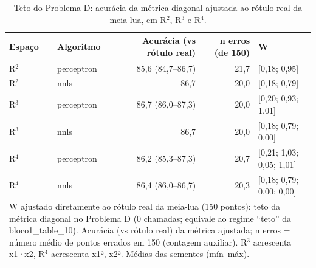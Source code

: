 \begin{table}[htbp]
\centering
\small
\caption{Teto do Problema D: acurácia da métrica diagonal ajustada ao rótulo real da meia-lua, em R$^2$, R$^3$ e R$^4$.}
\label{tab:bloco1_D_teto_oraculo_meialua}
\begin{tabular}{llrrl}
\toprule
Espaço & Algoritmo & Acurácia (vs rótulo real) & n erros (de 150) & W \\
\midrule
R$^2$ & perceptron & 85,6 (84,7–86,7) & 21,7 & [0,18; 0,95] \\
R$^2$ & nnls & 86,7 & 20,0 & [0,18; 0,79] \\
R$^3$ & perceptron & 86,7 (86,0–87,3) & 20,0 & [0,20; 0,93; 1,01] \\
R$^3$ & nnls & 86,7 & 20,0 & [0,18; 0,79; 0,00] \\
R$^4$ & perceptron & 86,2 (85,3–87,3) & 20,7 & [0,21; 1,03; 0,05; 1,01] \\
R$^4$ & nnls & 86,4 (86,0–86,7) & 20,3 & [0,18; 0,79; 0,00; 0,00] \\
\bottomrule
\multicolumn{5}{p{0.95\linewidth}}{\footnotesize W ajustado diretamente ao rótulo real da meia-lua (150 pontos): teto da métrica diagonal no Problema D (0 chamadas; equivale ao regime ``teto'' da bloco1\_table\_10). Acurácia (vs rótulo real) da métrica ajustada; n erros = número médio de pontos errados em 150 (contagem auxiliar). R$^3$ acrescenta x1·x2, R$^4$ acrescenta x1², x2². Médias das sementes (mín–máx).} \\
\end{tabular}
\end{table}
